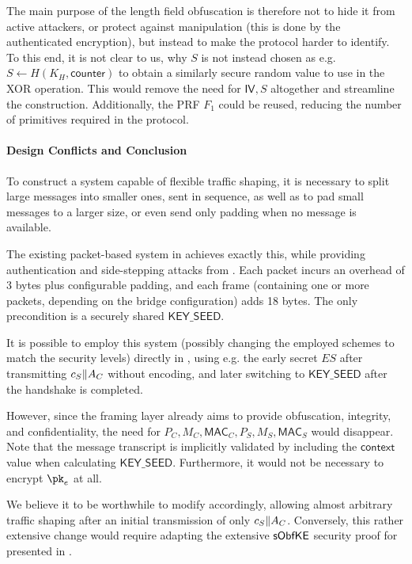 The main purpose of the length field obfuscation is therefore not to hide it from active attackers, or protect against manipulation (this is done by the authenticated encryption), but instead to make the protocol harder to identify. To this end, it is not clear to us, why $S$ is not instead chosen as e.g. $S \gets H(K_H, \mathsf{counter})$ to obtain a similarly secure random value to use in the XOR operation. This would remove the need for $\mathsf{IV}, S$ altogether and streamline the construction. Additionally, the \drivel{} PRF $F_1$ could be reused, reducing the number of primitives required in the protocol.

\paragraph{Design Conflicts and Conclusion}

To construct a system capable of flexible traffic shaping, it is necessary to split large messages into smaller ones, sent in sequence, as well as to pad small messages to a larger size, or even send only padding when no message is available.

The existing packet-based system in \obfsfour{} achieves exactly this, while providing authentication and side-stepping attacks from \cite{SP:AlbPatWat09}. Each packet incurs an overhead of 3 bytes plus configurable padding, and each frame (containing one or more packets, depending on the bridge configuration) adds 18 bytes.
The only precondition is a securely shared $\mathsf{KEY\_SEED}$.

It is possible to employ this system (possibly changing the employed schemes to match the security levels) directly in \drivel{}, using e.g. the early secret $ES$ after transmitting $c_S \| A_C$ without encoding, and later switching to $\mathsf{KEY\_SEED}$ after the handshake is completed.

However, since the framing layer already aims to provide obfuscation, integrity, and confidentiality, the need for $P_C, M_C, \mathsf{MAC}_C, P_S, M_S, \mathsf{MAC}_S$ would disappear. Note that the message transcript is implicitly validated by including the $\mathsf{context}$ value when calculating $\mathsf{KEY\_SEED}$. Furthermore, it would not be necessary to encrypt $\pk_e$ at all.

We believe it to be worthwhile to modify \drivel{} accordingly, allowing almost arbitrary traffic shaping after an initial transmission of only $c_S \| A_C$.
Conversely, this rather extensive change would require adapting the extensive $\mathsf{sObfKE}$ security proof for \drivel{} presented in \cite{EPRINT:GRSV25}.


